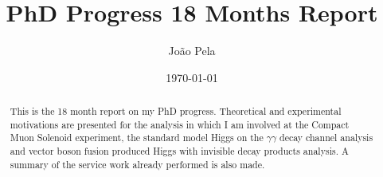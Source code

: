 \documentclass[%
reprint,
amsmath,
amssymb,
aps,
pra,
showkeys
]{revtex4-1}
\begin{document}

\title{PhD Progress 18 Months Report}


\author{João Pela}


\date{\today}

\begin{abstract}
This is the 18 month report on my PhD progress. Theoretical and experimental motivations are presented for the analysis
in which I am involved at the Compact Muon Solenoid experiment, the standard model Higgs on the $\gamma\gamma$ decay 
channel analysis and vector boson fusion produced Higgs with invisible decay products analysis. A summary of the 
service work already performed is also made.
\end{abstract}


\maketitle
\end{document}
